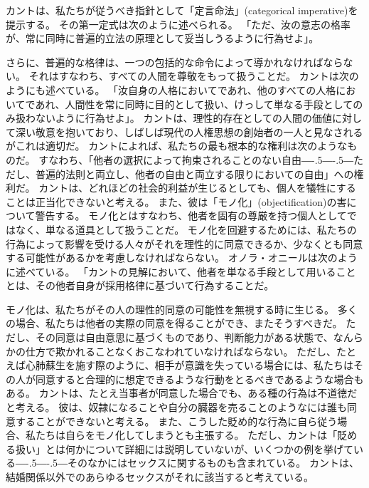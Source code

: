 \documentclass[paper=a4,book,openany]{jlreq}
\def\DDASH{―\kern-.5\zw―\kern-.5\zw―}
\begin{document}
カントは、私たちが従うべき指針として「定言命法」(categorical imperative)を提示する。
その第一定式は次のように述べられる。
「ただ、汝の意志の格率が、常に同時に普遍的立法の原理として妥当しうるように行為せよ」\citep[4:421, p.34]{kant11:_groun_metap_moral}。

さらに、普遍的な格律は、一つの包括的な命令によって導かれなければならない。
それはすなわち、すべての人間を尊敬をもって扱うことだ。
カントは次のようにも述べている。
「汝自身の人格においてであれ、他のすべての人格においてであれ、人間性を常に同時に目的として扱い、けっして単なる手段としてのみ扱わないように行為せよ」\citep[4:429, p.41]{kant11:_groun_metap_moral}。
カントは、理性的存在としての人間の価値に対して深い敬意を抱いており、しばしば現代の人権思想の創始者の一人と見なされるがこれは適切だ。
カントによれば、私たちの最も根本的な権利は次のようなものだ。
すなわち、「他者の選択によって拘束されることのない自由{\DDASH}ただし、普遍的法則と両立し、他者の自由と両立する限りにおいての自由」\citep[6:237]{kant96:_metap_moral}への権利だ。
カントは、どれほどの社会的利益が生じるとしても、個人を犠牲にすることは正当化できないと考える。
また、彼は「モノ化」(objectification)の害について警告する。
モノ化とはすなわち、他者を固有の尊厳を持つ個人としてではなく、単なる道具として扱うことだ。
モノ化を回避するためには、私たちの行為によって影響を受ける人々がそれを理性的に同意できるか、少なくとも同意する可能性があるかを考慮しなければならない。
オノラ・オニールは次のように述べている。
「カントの見解において、他者を単なる手段として用いることとは、その他者自身が採用格律に基づいて行為することだ\citep[p.138]{oneill89:_const_reason}。

モノ化は、私たちがその人の理性的同意の可能性を無視する時に生じる。
多くの場合、私たちは他者の実際の同意を得ることができ、またそうすべきだ。
ただし、その同意は自由意思に基づくものであり、判断能力がある状態で、なんらかの仕方で欺かれることなくおこなわれていなければならない。
ただし、たとえば心肺蘇生を施す際のように、相手が意識を失っている場合には、私たちはその人が同意すると合理的に想定できるような行動をとるべきであるような場合もある。
カントは、たとえ当事者が同意した場合でも、ある種の行為は不道徳だと考える。
彼は、奴隷になることや自分の臓器を売ることのようなには誰も同意することができないと考える。
また、こうした貶め的な行為に自ら従う場合、私たちは自らをモノ化してしまうとも主張する。
ただし、カントは「貶める扱い」とは何かについて詳細には説明していないが、いくつかの例を挙げている{\DDASH}そのなかにはセックスに関するものも含まれている。
カントは、結婚関係以外でのあらゆるセックスがそれに該当すると考えている。
\end{document}
